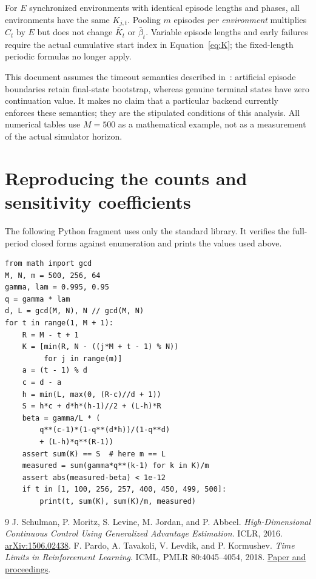 \documentclass[11pt,a4paper]{article}
\numberwithin{equation}{section}
\begin{document}
For $E$ synchronized environments with identical episode lengths and phases,
all environments have the same $K_{j,t}$. Pooling $m$ episodes \emph{per environment}
multiplies $C_t$ by $E$ but does not change $\bar K_t$ or $\bar\beta_t$.
Variable episode lengths and early failures require the actual cumulative start
index in Equation~\eqref{eq:K}; the fixed-length periodic formulas no longer apply.

This document assumes the timeout semantics described in~\cite{timelimits}:
artificial episode boundaries retain final-state bootstrap, whereas genuine
terminal states have zero continuation value. It makes no claim that a particular
backend currently enforces these semantics; they are the stipulated conditions of
this analysis. All numerical tables use $M=500$ as a mathematical example, not as
a measurement of the actual simulator horizon.

\appendix
\section{Reproducing the counts and sensitivity coefficients}
The following Python fragment uses only the standard library. It verifies the
full-period closed forms against enumeration and prints the values used above.
\begin{verbatim}
from math import gcd
M, N, m = 500, 256, 64
gamma, lam = 0.995, 0.95
q = gamma * lam
d, L = gcd(M, N), N // gcd(M, N)
for t in range(1, M + 1):
    R = M - t + 1
    K = [min(R, N - ((j*M + t - 1) % N))
         for j in range(m)]
    a = (t - 1) % d
    c = d - a
    h = min(L, max(0, (R-c)//d + 1))
    S = h*c + d*h*(h-1)//2 + (L-h)*R
    beta = gamma/L * (
        q**(c-1)*(1-q**(d*h))/(1-q**d)
        + (L-h)*q**(R-1))
    assert sum(K) == S  # here m == L
    measured = sum(gamma*q**(k-1) for k in K)/m
    assert abs(measured-beta) < 1e-12
    if t in [1, 100, 256, 257, 400, 450, 499, 500]:
        print(t, sum(K), sum(K)/m, measured)
\end{verbatim}

\begin{thebibliography}{9}
J. Schulman, P. Moritz, S. Levine, M. Jordan, and P. Abbeel.
\emph{High-Dimensional Continuous Control Using Generalized Advantage Estimation}.
ICLR, 2016. \href{https://arxiv.org/abs/1506.02438}{arXiv:1506.02438}.
F. Pardo, A. Tavakoli, V. Levdik, and P. Kormushev.
\emph{Time Limits in Reinforcement Learning}. ICML, PMLR 80:4045--4054, 2018.
\href{https://proceedings.mlr.press/v80/pardo18a.html}{Paper and proceedings}.
\end{thebibliography}
\end{document}
